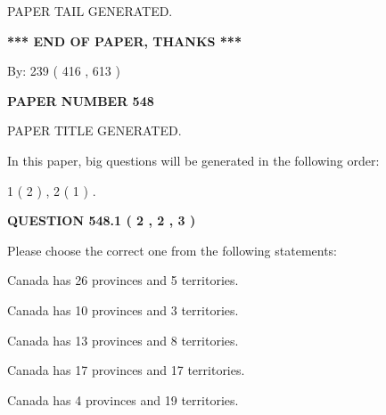 \documentclass[12pt]{article}
\begin{document}
   
   
\vspace{2.0in} PAPER TAIL GENERATED.
   
   
   
   
\vspace{1.0in} 
{\textbf{\large{ *** END OF PAPER, THANKS *** }}} 
   
   
\hspace{1.0in} By: 
 239 ( 416 ,  613 )
   
   
   
   
\newpage 
\setcounter{page}{ 
   548001 } 
   
   
   
   
 {\textbf{ \Large{ PAPER NUMBER  548  }}}
   
   
\vspace{0.2in}
   
   
   
   
   
   
   
   
 \vspace{0.2in}
 
 
 
 
   
   
 PAPER TITLE GENERATED.
   
   
   
\vspace{0.2in}
   
In this paper, big questions will be generated in the following order: 
   
   
   1 ( 2 )
 ,
   2 ( 1 )
 .
  
\vspace{0.2in}
  
{\textbf{\Large{QUESTION
548.1 
 ( 2 , 2 , 3 )
}}}
  
  
Please choose the correct one from the following statements:
 
 
Canada has  26 provinces and  5 territories.
 
 
Canada has 10  provinces and 3 territories.
 
 
Canada has  13 provinces and  8 territories.
 
 
Canada has  17 provinces and  17 territories.
 
 
Canada has   4 provinces and  19 territories.
 
\end{document}
